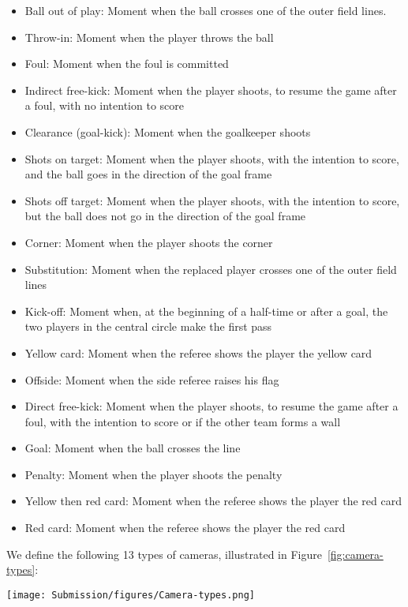 \documentclass[final]{cvsports}
\begin{document}
\begin{itemize}
    \item Ball out of play: Moment when the ball crosses one of the outer field lines.
    \item Throw-in: Moment when the player throws the ball  
    \item Foul: Moment when the foul is committed  
    \item Indirect free-kick: Moment when the player shoots, to resume the game after a foul, with no intention to score
    \item Clearance (goal-kick): Moment when the goalkeeper shoots
    \item Shots on target: Moment when the player shoots, with the intention to score, and the ball goes in the direction of the goal frame 
    \item Shots off target: Moment when the player shoots, with the intention to score, but the ball does not go in the direction of the goal frame
    \item Corner: Moment when the player shoots the corner
    \item Substitution: Moment when the replaced player crosses one of the outer field lines 
    \item Kick-off: Moment when, at the beginning of a half-time or after a goal, the two players in the central circle make the first pass
    \item Yellow card: Moment when the referee shows the player the yellow card
    \item Offside: Moment when the side referee raises his flag
    \item Direct free-kick: Moment when the player shoots, to resume the game after a foul, with the intention to score or if the other team forms a wall
    \item Goal: Moment when the ball crosses the line
    \item Penalty: Moment when the player shoots the penalty
    \item Yellow then red card: Moment when the referee shows the player the red card
    \item Red card: Moment when the referee shows the player the red card

\end{itemize}

 We define the following 13 types of cameras, illustrated in Figure~\ref{fig:camera-types}:

\begin{figure*}
    \centering
    \texttt{[image: Submission/figures/Camera-types.png]}
    \caption{\textbf{Cameras.} An example of each camera shot identified in SoccerNet-v2.}
    \label{fig:camera-types}
\end{figure*}
\end{document}
